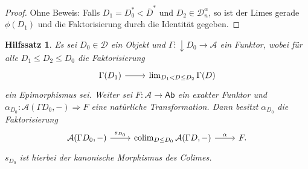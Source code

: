 \documentclass[a4paper, parskip=half]{scrartcl}
\theoremstyle{marginbreak}
\newtheorem{lemma}[remark]{Hilfssatz}
\theoremstyle{nonumberplain}
\newtheorem{proof}{Beweis.}
\newcommand{\defiff}{\mathrel{\vcentcolon\Longleftrightarrow}}
\newcommand\ccat\mathsf
\newcommand\cat\mathcal
\newcommand{\down}[1]{{\downarrow}#1}
\newcommand{\p}[1]{\iftoggle{proofs}{#1}{}}
\newcommand\nat\Rightarrow
\DeclareMathOperator{\colim}{colim}
\begin{document}
{\begin{proof}
			Ohne Beweis: Falls $D_1=D_0^*<\overline{D}^*$ und $D_2\in\cat{D}_n^\alpha$,
			so ist der Limes gerade $\phi(D_1)$ und die Faktorisierung durch die Identität gegeben.
		\end{proof}}
		\begin{lemma}\label{func}
			Es sei $D_0\in\cat{D}$ ein Objekt und $\Gamma\colon \down{D_0}\to\cat{A}$
			ein Funktor, wobei für alle $D_1\leq D_2\leq D_0$ die Faktorisierung
			\[
				\begin{tikzcd}
					\Gamma(D_1) \arrow[r] & \lim_{D_1<D\leq D_2} \Gamma(D)
				\end{tikzcd}
			\]
			ein Epimorphismus sei. Weiter sei $F\colon\cat{A}\to\ccat{Ab}$ ein exakter
			Funktor und $\alpha_{D_0}\colon \cat{A}(\Gamma D_0, {-})\nat F$
			eine natürliche Transformation. Dann besitzt $\alpha_{D_0}$ die
			Faktorisierung
			\[
				\begin{tikzcd}
					\cat{A}(\Gamma D_0, {-}) \arrow{r}{s_{D_0}} & \colim_{D\leq D_0}\cat{A}(\Gamma D, {-}) \arrow{r}{\alpha} & F.
				\end{tikzcd}
			\]
			$s_{D_0}$ ist hierbei der kanonische Morphismus des Colimes.
		\end{lemma}
		\p{\begin{proof}
			Eine Teilmenge $S\subseteq\down{D_0}$ nennen wir finales Segment von
			$D_0$, falls $D\in S \wedge D\leq D'\leq D_0 \implies D'\in S$.

			Es sei $\mathcal{S}$ die Menge aller Paare $(S, (\alpha_D)_{D\in S})$
			für die gilt:
			\begin{enumerate}[label=(\arabic*),noitemsep]
				\item $S$ ist finales Segment von $\down{D_0}$,
				\item Die $\alpha_D\colon\cat{A}(\Gamma(D), {-})\nat F$ mit $D\in S$ bilden einen Cokegel (in $\ccat{Ab}^\cat{A}$).
			\end{enumerate}
			Wir definieren eine Halbordnung auf $\mathcal{S}$ durch
			\[
				(S, (\alpha_D)_{D\in S})\leq (S', (\alpha_D')_{D\in S})\defiff S\subseteq S'\wedge \forall D\in S: \alpha_D'=\alpha_D.
			\]
			Jede aufsteigende Kette in $\mathcal{S}$ hat eine obere Schranke (durch
			Vereinigung und Erweiterung). Das Lemma von Zorn liefert ein maximales
			Element $(\overline{S}, (\alpha_D)_{D\in\overline{S}})$. Falls $\overline{S}=\down{D_0}$,
			so haben wir einen Cokegel in der Funktorkategorie gefunden, der zu dem in der Behauptung
			gegebenen Colimes passt und damit auch die zugehörige Faktorisierung.

			Falls $\overline{S}\neq\down{D_0}$, existiert $D_1\leq D_0$, $D_1\notin\overline{S}$.
			Das Segment $[D_1, D_0]$ ist endlich nach \ref{fin} und daher finden wir
			ein $D_2\in [D_1, D_0]$ mit $D_2\notin\overline{S}$, $\forall D\in\overline{S}:D_2<D\leq D_0$.
			Das Yoneda-Lemma ordnet für jedes $D$ mit $D_2<D\leq D_0$ der natürlichen
			Transformation $\alpha_D\colon\cat{A}(\Gamma(D),{-})\nat F$ ein Element $a_D\in F\Gamma(D)$ zu.
		\end{proof}}
\end{document}
